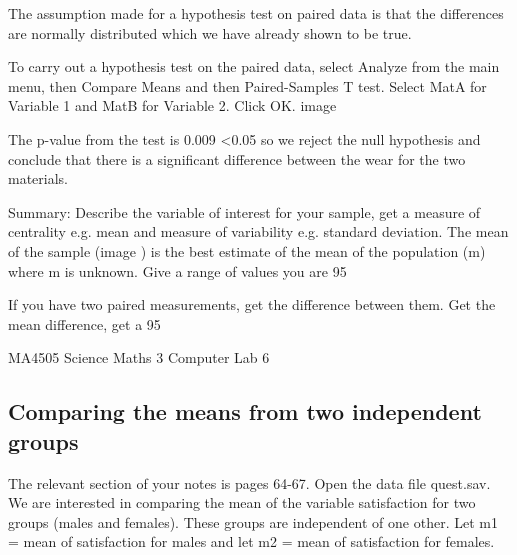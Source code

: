 The assumption made for a hypothesis test on paired data is that the differences are normally distributed which we have already shown to be true.
 
To carry out a hypothesis test on the paired data, select Analyze from the main menu, then Compare Means and then Paired-Samples T test. Select MatA for Variable 1 and MatB for Variable 2. Click OK.
image
 
The p-value from the test is 0.009 <0.05 so we reject the null hypothesis and conclude that there is a significant difference between the wear for the two materials.
 
 
 
 
 
 
 
 
 
Summary: Describe the variable of interest for your sample, get a measure of centrality e.g. mean and measure of variability e.g. standard deviation. The mean of the sample (image ) is the best estimate of the mean of the population (m)
where m is unknown. Give a range of values you are 95%
 
If you have two paired measurements, get the difference between them. Get the mean difference, get a 95%
 
  
 
 
MA4505 Science Maths 3 Computer Lab 6
 
\subsection{Comparing the means from two independent groups}
 
The relevant section of your notes is pages 64-67. Open the data file quest.sav. We are interested in comparing the mean of the variable satisfaction for two groups (males and females). These groups are independent of one other. Let m1 = mean of satisfaction for males and let m2 = mean of satisfaction for females.
 
